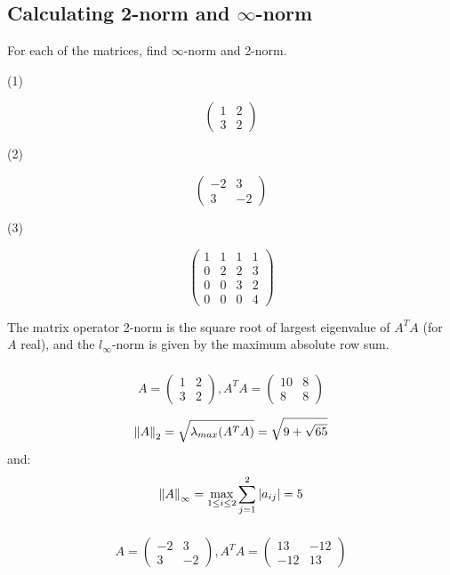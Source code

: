 \documentclass[12pt]{article} %
\newcommand{\1}[1]{\mathds{1}\left[#1\right]}
\begin{document}
\subsection{Calculating 2-norm and $\infty$-norm}

For each of the matrices, find $\infty$-norm and 2-norm. 

(1)

$$
	\begin{pmatrix}
		1 & 2 \\
		3 & 2
	\end{pmatrix}
$$

(2)

$$
	\begin{pmatrix}
		-2 & 3 \\
		3 & -2
	\end{pmatrix}
$$

(3)

$$
	\begin{pmatrix}
		1 & 1 & 1 & 1 \\
		0 & 2 & 2 & 3 \\
		0 & 0 & 3 & 2 \\
		0 & 0 & 0 & 4
	\end{pmatrix}
$$

The matrix operator 2-norm is the square root of largest eigenvalue of $A^TA$ (for $A$ real), and the $l_{\infty}$-norm is given by the maximum absolute row sum.
\subsubsection{}
$$
	A = \begin{pmatrix}
	1 & 2\\
	3 & 2
	\end{pmatrix}, 
	A^TA = \begin{pmatrix}
	10 & 8\\
	8 & 8
	\end{pmatrix}
$$

$$
	\norm{A}_2 = \sqrt{\lambda_{max}(A^TA)} = \sqrt{9+\sqrt{65}}
$$ and:
$$
	\norm{A}_{\infty} = \max_{1\le i\le 2}\sum_{j=1}^2\abs{a_{ij}} = 5
$$



\subsubsection{}
$$
A = \begin{pmatrix}
	-2 & 3\\
	3 & -2
\end{pmatrix}, 
A^TA = 
\begin{pmatrix}
	13 & -12\\
	-12 & 13
\end{pmatrix}
$$
\end{document}
